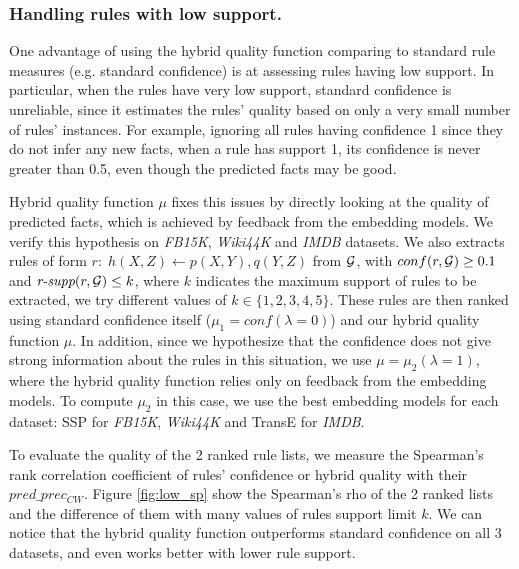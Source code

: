 \subsubsection{Handling rules with low support.}
One advantage of using the hybrid quality function comparing to standard rule measures (e.g. standard confidence) is at assessing rules having low support. In particular, when the rules have very low support, standard confidence is unreliable, since it estimates the rules' quality based on only a very small number of rules' instances. For example, ignoring all rules having confidence 1 since they do not infer any new facts, when a rule has support 1, its confidence is never greater than 0.5, even though the predicted facts may be good. 

Hybrid quality function $\mu$ fixes this issues by directly looking at the quality of predicted facts, which is achieved by feedback from the embedding models. We verify this hypothesis on \textit{FB15K}, \textit{Wiki44K} and \textit{IMDB} datasets. We also extracts rules of form $r:\;h(X,Z) \leftarrow p(X,Y), q(Y,Z)$ from $\mathcal{G}$, with $conf(r,\mathcal{G}) \geq 0.1$ and $\textit{r-supp}(r,\mathcal{G}) \leq k$, where $k$ indicates the maximum support of rules to be extracted, we try different values of $k \in \{1,2,3,4,5\}$. These rules are then ranked using standard confidence itself ($\mu_1 = conf (\lambda = 0)$) and our hybrid quality function $\mu$. In addition, since we hypothesize that the confidence does not give strong information about the rules in this situation, we use $\mu = \mu_2 (\lambda = 1)$, where the hybrid quality function relies only on feedback from the embedding models. To compute $\mu_2$ in this case, we use the best embedding models for each dataset: SSP for \textit{FB15K}, \textit{Wiki44K} and TransE for \textit{IMDB}.

To evaluate the quality of the 2 ranked rule lists, we measure the Spearman's rank correlation coefficient of rules' confidence or hybrid quality with their $pred\_prec_{CW}$. Figure \ref{fig:low_sp} show the Spearman's rho of the 2 ranked lists and the difference of them with many values of rules support limit $k$. We can notice that the hybrid quality function outperforms standard confidence on all 3 datasets, and even works better with lower rule support.